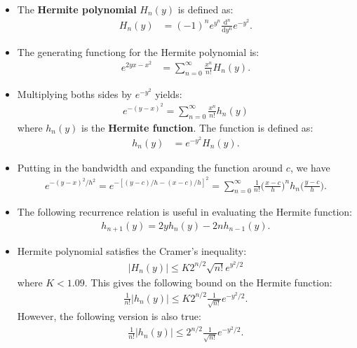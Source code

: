 \documentclass[10pt]{article}
\newcommand{\dee}{\mathrm{d}}
\begin{document}
\begin{itemize}
  \item The {\bf Hermite polynomial} $H_n(y)$ is defined as:
  \begin{align*}
    H_n(y) &= (-1)^n e^{y^n} \frac{\dee^n }{\dee y^n} e^{-y^2}.
  \end{align*}
  
  \item The generating functiong for the Hermite polynomial is:
  \begin{align*}
    e^{2yx - x^2} &= \sum_{n=0}^\infty \frac{x^n}{n!} H_n(y).
  \end{align*}
  
  \item Multiplying boths sides by $e^{-y^2}$ yields:
  \begin{align*}
    e^{-(y-x)^2} = \sum_{n=0}^\infty \frac{x^n}{n!} h_n(y)
  \end{align*}
  where $h_n(y)$ is the {\bf Hermite function}. The function is defined as:
  \begin{align*}
    h_n(y) &= e^{-y^2} H_n(y).
  \end{align*}
  
  \item Putting in the bandwidth and expanding the function around $c$, we have
  \begin{align*}
    e^{-(y-x)^2/h^2} = e^{-[(y-c)/h - (x-c)/h]^2} = \sum_{n=0}^\infty \frac{1}{n!} \bigg( \frac{x - c}{h} \bigg)^n h_n\bigg( \frac{y-c}{h} \bigg).
  \end{align*}
  
  \item The following recurrence relation is useful in evaluating the Hermite function:
  \begin{align*}
    h_{n+1}(y) = 2yh_n(y) - 2n h_{n-1}(y).
  \end{align*}
  
  \item Hermite polynomial satisfies the Cramer's inequality:
  \begin{align*}
    |H_n(y)| \leq K 2^{n/2} \sqrt{n!} e^{y^2/2}
  \end{align*}
  where $K < 1.09$.
  This gives the following bound on the Hermite function:
  \begin{align*}
    \frac{1}{n!} |h_n(y)| \leq K 2^{n/2} \frac{1}{\sqrt{n!}} e^{-y^2/2}.
  \end{align*}
  However, the following version is also true:
  \begin{align*}
    \frac{1}{n!} |h_n(y)| \leq 2^{n/2} \frac{1}{\sqrt{n!}} e^{-y^2/2}.
  \end{align*}
\end{itemize}
\end{document}

